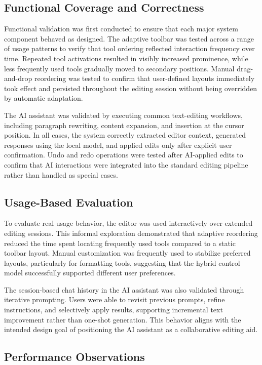 \documentclass[sigconf]{acmart}
\begin{document}
\subsection{Functional Coverage and Correctness}

Functional validation was first conducted to ensure that each major system component behaved as designed. The adaptive toolbar was tested across a range of usage patterns to verify that tool ordering reflected interaction frequency over time. Repeated tool activations resulted in visibly increased prominence, while less frequently used tools gradually moved to secondary positions. Manual drag-and-drop reordering was tested to confirm that user-defined layouts immediately took effect and persisted throughout the editing session without being overridden by automatic adaptation.

The AI assistant was validated by executing common text-editing workflows, including paragraph rewriting, content expansion, and insertion at the cursor position. In all cases, the system correctly extracted editor context, generated responses using the local model, and applied edits only after explicit user confirmation. Undo and redo operations were tested after AI-applied edits to confirm that AI interactions were integrated into the standard editing pipeline rather than handled as special cases.

\subsection{Usage-Based Evaluation}

To evaluate real usage behavior, the editor was used interactively over extended editing sessions. This informal exploration demonstrated that adaptive reordering reduced the time spent locating frequently used tools compared to a static toolbar layout. Manual customization was frequently used to stabilize preferred layouts, particularly for formatting tools, suggesting that the hybrid control model successfully supported different user preferences.

The session-based chat history in the AI assistant was also validated through iterative prompting. Users were able to revisit previous prompts, refine instructions, and selectively apply results, supporting incremental text improvement rather than one-shot generation. This behavior aligns with the intended design goal of positioning the AI assistant as a collaborative editing aid.

\subsection{Performance Observations}
\end{document}
